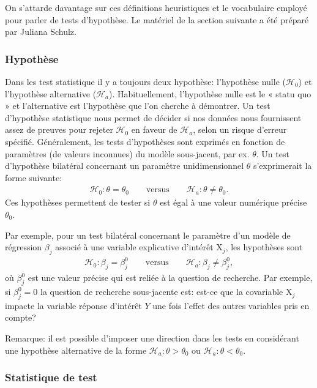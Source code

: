 \documentclass[
  11pt,
  letterpaper,
]{article}
\theoremstyle{definition}
\theoremstyle{definition}
\theoremstyle{definition}
\theoremstyle{remark}
\begin{document}
On s'attarde davantage sur ces définitions heuristiques et le vocabulaire employé pour parler de tests d'hypothèse. Le matériel de la section suivante a été préparé par Juliana Schulz.

\hypertarget{hypothuxe8se}{%
\subsubsection{Hypothèse}\label{hypothuxe8se}}

Dans les test statistique il y a toujours deux hypothèse: l'hypothèse nulle (\(\mathscr{H}_{0}\)) et l'hypothèse alternative (\(\mathscr{H}_a\)). Habituellement, l'hypothèse nulle est le « statu quo » et l'alternative est l'hypothèse que l'on cherche à démontrer. Un test d'hypothèse statistique nous permet de décider si nos données nous fournissent assez de preuves pour rejeter \(\mathscr{H}_0\) en faveur de \(\mathscr{H}_a\), selon un risque d'erreur spécifié. Généralement, les tests d'hypothèses sont exprimés en fonction de paramètres (de valeurs inconnues) du modèle sous-jacent, par ex. \(\theta\). Un test d'hypothèse bilatéral concernant un paramètre unidimensionnel \(\theta\) s'exprimerait la forme suivante:
\begin{align*}
\mathscr{H}_0: \theta=\theta_0 \qquad \text{versus} \qquad \mathscr{H}_a:\theta \neq \theta_0.
\end{align*}
Ces hypothèses permettent de tester si \(\theta\) est égal à une valeur numérique précise \(\theta_0\).

Par exemple, pour un test bilatéral concernant le paramètre d'un modèle de régression \(\beta_j\) associé à une variable explicative d'intérêt \(\mathrm{X}_j\), les hypothèses sont
\begin{align*}
\mathscr{H}_0: \beta_j=\beta_j^0 \qquad \text{versus} \qquad \mathscr{H}_a:\beta_j \neq \beta_j^0, 
\end{align*}
où \(\beta_j^0\) est une valeur précise qui est reliée à la question de recherche. Par exemple, si \(\beta_j^0=0\) la question de recherche sous-jacente est: est-ce que la covariable \(\mathrm{X}_j\) impacte la variable réponse d'intérêt \(Y\) une fois l'effet des autres variables pris en compte?

Remarque: il est possible d'imposer une direction dans les tests en considérant une hypothèse alternative de la forme \(\mathscr{H}_a: \theta > \theta_0\) ou \(\mathscr{H}_a: \theta < \theta_0\).

\hypertarget{statistique-de-test}{%
\subsubsection{Statistique de test}\label{statistique-de-test}}
\end{document}
